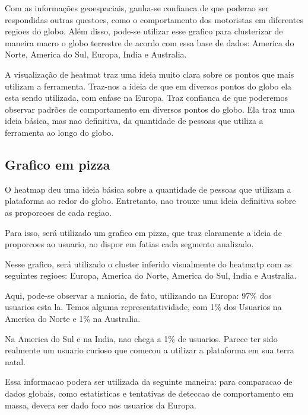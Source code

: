 \documentclass[10pt, conference]{IEEEtran}
\begin{document}
Com as informações geoespaciais, ganha-se confianca de que poderao ser respondidas outras questoes,
como o comportamento dos motoristas em diferentes regioes do globo. Além disso, pode-se utilizar
esse grafico para clusterizar de maneira macro o globo terrestre de acordo com essa base de 
dados: America do Norte, America do Sul, Europa, India e Australia.

A visualização de heatmat traz uma ideia muito clara sobre os pontos que mais utilizam a 
ferramenta. Traz-nos a ideia de que em diversos pontos do globo ela esta sendo utilizada, com
enfase na Europa. Traz confianca de que poderemos observar padrões de comportamento em diversos
pontos do globo. Ela traz uma ideia básica, mas nao definitiva, da quantidade de pessoas
que utiliza a ferramenta ao longo do globo.




\subsection{Grafico em pizza}

O heatmap deu uma ideia básica sobre a quantidade de pessoas que utilizam a plataforma ao redor
do globo. Entretanto, nao trouxe uma ideia definitiva sobre as proporcoes de cada regiao.

Para isso, será utilizado um grafico em pizza, que traz claramente a ideia de proporcoes ao
usuario, ao dispor em fatias cada segmento analizado.

Nesse grafico, será utilizado o cluster inferido visualmente do heatmatp com as seguintes
regioes: Europa, America do Norte, America do Sul, India e Australia.

Aqui, pode-se observar a maioria, de fato, utilizando na Europa: 97\% dos usuarios
esta la. Temos alguma representatividade, com 1\% dos Usuarios na America do Norte e 1\% 
na Australia.

Na America do Sul e na India, nao chega a 1\% de usuarios. Parece ter sido realmente um usuario
curioso que comecou a utilizar a plataforma em sua terra natal.

Essa informacao podera ser utilizada da seguinte maneira: para comparacao de
dados globais, como estatisticas e tentativas de deteccao de comportamento em massa, devera
ser dado foco nos usuarios da Europa.
\end{document}
